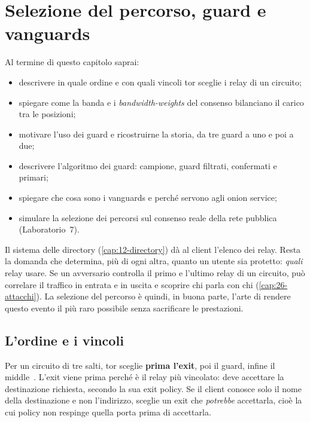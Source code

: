 \chapter{Selezione del percorso, guard e vanguards}\label{cap:13-percorso}

\begin{obiettivi}
Al termine di questo capitolo saprai:
\begin{itemize}[nosep]
  \item descrivere in quale ordine e con quali vincoli tor sceglie i relay di un circuito;
  \item spiegare come la banda e i \emph{bandwidth-weights} del consenso bilanciano il carico tra le posizioni;
  \item motivare l'uso dei guard e ricostruirne la storia, da tre guard a uno e poi a due;
  \item descrivere l'algoritmo dei guard: campione, guard filtrati, confermati e primari;
  \item spiegare che cosa sono i vanguards e perché servono agli onion service;
  \item simulare la selezione dei percorsi sul consenso reale della rete pubblica (Laboratorio~7).
\end{itemize}
\end{obiettivi}

Il sistema delle directory (\cref{cap:12-directory}) dà al client l'elenco dei relay. Resta la domanda che determina, più di ogni altra, quanto un utente sia protetto: \emph{quali} relay usare. Se un avversario controlla il primo e l'ultimo relay di un circuito, può correlare il traffico in entrata e in uscita e scoprire chi parla con chi (\cref{cap:26-attacchi}). La selezione del percorso è quindi, in buona parte, l'arte di rendere questo evento il più raro possibile senza sacrificare le prestazioni.

\section{L'ordine e i vincoli}\label{sec:percorso-vincoli}

Per un circuito di tre salti, tor sceglie \textbf{prima l'exit}, poi il guard, infine il middle~. L'exit viene prima perché è il relay più vincolato: deve accettare la destinazione richiesta, secondo la sua exit policy. Se il client conosce solo il nome della destinazione e non l'indirizzo, sceglie un exit che \emph{potrebbe} accettarla, cioè la cui policy non respinge quella porta prima di accettarla.

